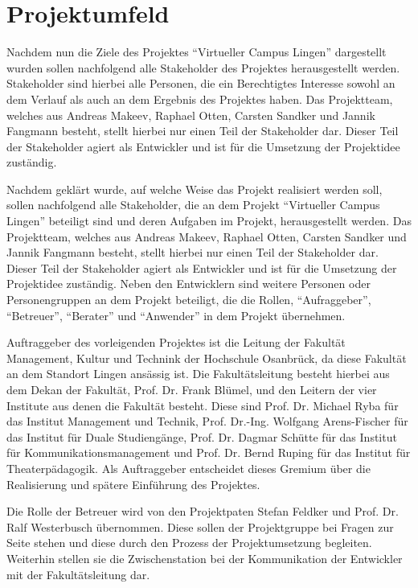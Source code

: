 \section{Projektumfeld}
\label{sec:Projektumfeld}

Nachdem nun die Ziele des Projektes "`Virtueller Campus Lingen"' dargestellt
wurden sollen nachfolgend alle Stakeholder des Projektes herausgestellt werden.
Stakeholder sind hierbei alle Personen, die ein Berechtigtes Interesse sowohl an
dem Verlauf als auch an dem Ergebnis des Projektes haben. Das Projektteam,
welches aus Andreas Makeev, Raphael Otten, Carsten Sandker und Jannik Fangmann
besteht, stellt hierbei nur einen Teil der Stakeholder dar. Dieser Teil der
Stakeholder agiert als Entwickler und ist für die Umsetzung der Projektidee
zuständig.


Nachdem geklärt wurde, auf welche Weise das Projekt realisiert werden soll,
sollen nachfolgend alle Stakeholder, die an dem Projekt "`Virtueller Campus
Lingen"' beteiligt sind und deren Aufgaben im Projekt, herausgestellt werden.
Das Projektteam, welches aus Andreas Makeev, Raphael Otten, Carsten Sandker und
Jannik Fangmann besteht, stellt hierbei nur einen Teil der Stakeholder dar.
Dieser Teil der Stakeholder agiert als Entwickler und ist für die Umsetzung der
Projektidee zuständig. Neben den Entwicklern sind weitere Personen oder
Personengruppen an dem Projekt beteiligt, die die Rollen, "`Aufraggeber"',
"`Betreuer"', "`Berater"' und "`Anwender"' in dem Projekt übernehmen.

Auftraggeber des vorleigenden Projektes ist die Leitung der Fakultät Management,
Kultur und Technink der Hochschule Osanbrück, da diese Fakultät an dem Standort
Lingen ansässig ist. Die Fakultätsleitung besteht hierbei aus dem Dekan der
Fakultät, Prof. Dr. Frank Blümel, und den Leitern der vier Institute aus denen
die Fakultät besteht. Diese sind Prof. Dr. Michael Ryba für das Institut
Management und Technik, Prof. Dr.-Ing. Wolfgang Arens-Fischer für das Institut
für Duale Studiengänge, Prof. Dr. Dagmar Schütte für das Institut für
Kommunikationsmanagement und Prof. Dr. Bernd Ruping für das Institut für
Theaterpädagogik. Als Auftraggeber entscheidet dieses Gremium über die
Realisierung und spätere Einführung des Projektes. 

Die Rolle der Betreuer wird von den Projektpaten Stefan Feldker und Prof. Dr.
Ralf Westerbusch übernommen. Diese sollen der Projektgruppe bei Fragen zur
Seite stehen und diese durch den Prozess der Projektumsetzung begleiten.
Weiterhin stellen sie die Zwischenstation bei der Kommunikation der Entwickler
mit der Fakultätsleitung dar.

